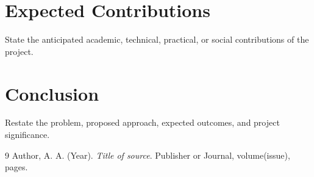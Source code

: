 \documentclass[11pt]{article}
\begin{document}
\section{Expected Contributions}
State the anticipated academic, technical, practical, or social contributions of
the project.

\section{Conclusion}
Restate the problem, proposed approach, expected outcomes, and project significance.

\begin{thebibliography}{9}
Author, A. A. (Year). \textit{Title of source}. Publisher or Journal, volume(issue), pages.
\end{thebibliography}
\end{document}
